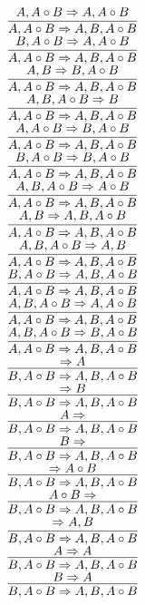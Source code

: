 \documentclass[11pt]{article}
\begin{document}
\begin{center}
\bigskip
\\$\infer{A, A\circ B\Rightarrow A, B, A\circ B}{A, A\circ B\Rightarrow A, A\circ B}$
\bigskip
\\$\infer{A, A\circ B\Rightarrow A, B, A\circ B}{B, A\circ B\Rightarrow A, A\circ B}$
\bigskip
\\$\infer{A, A\circ B\Rightarrow A, B, A\circ B}{A, B\Rightarrow B, A\circ B}$
\bigskip
\\$\infer{A, A\circ B\Rightarrow A, B, A\circ B}{A, B, A\circ B\Rightarrow B}$
\bigskip
\\$\infer{A, A\circ B\Rightarrow A, B, A\circ B}{A, A\circ B\Rightarrow B, A\circ B}$
\bigskip
\\$\infer{A, A\circ B\Rightarrow A, B, A\circ B}{B, A\circ B\Rightarrow B, A\circ B}$
\bigskip
\\$\infer{A, A\circ B\Rightarrow A, B, A\circ B}{A, B, A\circ B\Rightarrow A\circ B}$
\bigskip
\\$\infer{A, A\circ B\Rightarrow A, B, A\circ B}{A, B\Rightarrow A, B, A\circ B}$
\bigskip
\\$\infer{A, A\circ B\Rightarrow A, B, A\circ B}{A, B, A\circ B\Rightarrow A, B}$
\bigskip
\\$\infer{A, A\circ B\Rightarrow A, B, A\circ B}{B, A\circ B\Rightarrow A, B, A\circ B}$
\bigskip
\\$\infer{A, A\circ B\Rightarrow A, B, A\circ B}{A, B, A\circ B\Rightarrow A, A\circ B}$
\bigskip
\\$\infer{A, A\circ B\Rightarrow A, B, A\circ B}{A, B, A\circ B\Rightarrow B, A\circ B}$
\bigskip
\\$\infer{B, A\circ B\Rightarrow A, B, A\circ B}{\Rightarrow A}$
\bigskip
\\$\infer{B, A\circ B\Rightarrow A, B, A\circ B}{\Rightarrow B}$
\bigskip
\\$\infer{B, A\circ B\Rightarrow A, B, A\circ B}{A\Rightarrow }$
\bigskip
\\$\infer{B, A\circ B\Rightarrow A, B, A\circ B}{B\Rightarrow }$
\bigskip
\\$\infer{B, A\circ B\Rightarrow A, B, A\circ B}{\Rightarrow A\circ B}$
\bigskip
\\$\infer{B, A\circ B\Rightarrow A, B, A\circ B}{A\circ B\Rightarrow }$
\bigskip
\\$\infer{B, A\circ B\Rightarrow A, B, A\circ B}{\Rightarrow A, B}$
\bigskip
\\$\infer{B, A\circ B\Rightarrow A, B, A\circ B}{A\Rightarrow A}$
\bigskip
\\$\infer{B, A\circ B\Rightarrow A, B, A\circ B}{B\Rightarrow A}$

\end{center}
\end{document}
